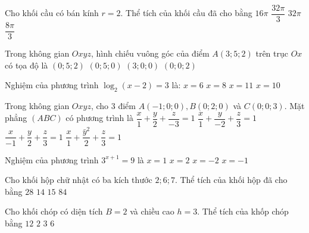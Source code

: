 \begin{ex}%
Cho khối cầu có bán kính $r=2$. Thể tích của khối cầu đã cho bằng
\choice
{$16\pi$}
{\True $\dfrac{32\pi}{3}$}
{$32\pi$}
{$\dfrac{8\pi}{3}$}

\end{ex}
\begin{ex}%
Trong không gian $O x y z$, hình chiếu vuông góc của điểm $A(3; 5; 2)$ trên trục $O x$ có tọa độ là
\choice
{$(0; 5; 2)$}
{$(0; 5; 0)$}
{\True $(3; 0; 0)$}
{$(0; 0; 2)$}

\end{ex}
\begin{ex}%
Nghiệm của phương trình $\log_2(x-2)=3$ là:
\choice
{$x=6$}
{$x=8$}
{$x=11$}
{\True $x=10$}

\end{ex}
\begin{ex}%
{\vspace{-0.5cm}

}

\end{ex}
\begin{ex}%
Trong không gian $O x y z$, cho $3$ điểm $A(-1; 0; 0), B(0; 2; 0)$ và $C(0; 0; 3)$. Mặt phẳng $(ABC)$ có phương trình là
\choice
{$\dfrac{x}{1}+\dfrac{y}{2}+\dfrac{z}{-3}=1$}
{$\dfrac{x}{1}+\dfrac{y}{-2}+\dfrac{z}{3}=1$}
{\True $\dfrac{x}{-1}+\dfrac{y}{2}+\dfrac{z}{3}=1$}
{$\dfrac{x}{1}+\dfrac{\bar{y}^2}{2}+\dfrac{z}{3}=1$}

\end{ex}
\begin{ex}%
Nghiệm của phương trình $3^{x+1}=9$ là
\choice
{\True $x=1$}
{$x=2$}
{$x=-2$}
{$x=-1$}

\end{ex}
\begin{ex}%
Cho khối hộp chữ nhật có ba kích thước $2; 6; 7$. Thể tích của khối hộp đã cho bằng
\choice
{$28$}
{$14$}
{$15$}
{\True $84$}

\end{ex}
\begin{ex}%
Cho khối chóp có diện tích $B=2$ và chiều cao $h=3$. Thể tích của khốp chóp bằng
\choice
{$12$}
{\True $2$}
{$3$}
{$6$}

\end{ex}
